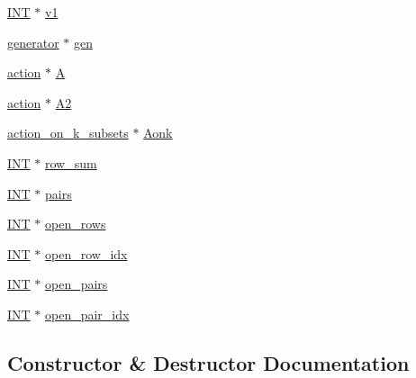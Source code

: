 \begin{DoxyCompactItemize}
\item 
\mbox{\hyperlink{galois_8h_a09fddde158a3a20bd2dcadb609de11dc}{I\+NT}} $\ast$ \mbox{\hyperlink{classregular__ls__generator_afed92ea43d113c07963c550a7ac187d3}{v1}}
\item 
\mbox{\hyperlink{classgenerator}{generator}} $\ast$ \mbox{\hyperlink{classregular__ls__generator_a2be2893f203cb7484f1f52abaf418533}{gen}}
\item 
\mbox{\hyperlink{classaction}{action}} $\ast$ \mbox{\hyperlink{classregular__ls__generator_a10a7ab35cdbe6ac99666fadf6f1b82e9}{A}}
\item 
\mbox{\hyperlink{classaction}{action}} $\ast$ \mbox{\hyperlink{classregular__ls__generator_acb16ed83e605a3bb4395baeb7c6b50b1}{A2}}
\item 
\mbox{\hyperlink{classaction__on__k__subsets}{action\+\_\+on\+\_\+k\+\_\+subsets}} $\ast$ \mbox{\hyperlink{classregular__ls__generator_a138dd58bb67492760f336257a7bdc646}{Aonk}}
\item 
\mbox{\hyperlink{galois_8h_a09fddde158a3a20bd2dcadb609de11dc}{I\+NT}} $\ast$ \mbox{\hyperlink{classregular__ls__generator_a5002f538fc2be47074cfc476441495b3}{row\+\_\+sum}}
\item 
\mbox{\hyperlink{galois_8h_a09fddde158a3a20bd2dcadb609de11dc}{I\+NT}} $\ast$ \mbox{\hyperlink{classregular__ls__generator_a65fd901b7e57c14b5cd4832f71bab962}{pairs}}
\item 
\mbox{\hyperlink{galois_8h_a09fddde158a3a20bd2dcadb609de11dc}{I\+NT}} $\ast$ \mbox{\hyperlink{classregular__ls__generator_a3a9fb377c922660e49fb2d07c1cd8ed2}{open\+\_\+rows}}
\item 
\mbox{\hyperlink{galois_8h_a09fddde158a3a20bd2dcadb609de11dc}{I\+NT}} $\ast$ \mbox{\hyperlink{classregular__ls__generator_ae3433fed218b63a96704000e835c7135}{open\+\_\+row\+\_\+idx}}
\item 
\mbox{\hyperlink{galois_8h_a09fddde158a3a20bd2dcadb609de11dc}{I\+NT}} $\ast$ \mbox{\hyperlink{classregular__ls__generator_a93449dd11c952d79b392ab13cd577b7e}{open\+\_\+pairs}}
\item 
\mbox{\hyperlink{galois_8h_a09fddde158a3a20bd2dcadb609de11dc}{I\+NT}} $\ast$ \mbox{\hyperlink{classregular__ls__generator_ac1874b305e29033a730f66d2f3e2aec0}{open\+\_\+pair\+\_\+idx}}
\end{DoxyCompactItemize}


\subsection{Constructor \& Destructor Documentation}
\mbox{\label{classregular__ls__generator_a8463dab676426e77dfef3718d3de389d}} 
